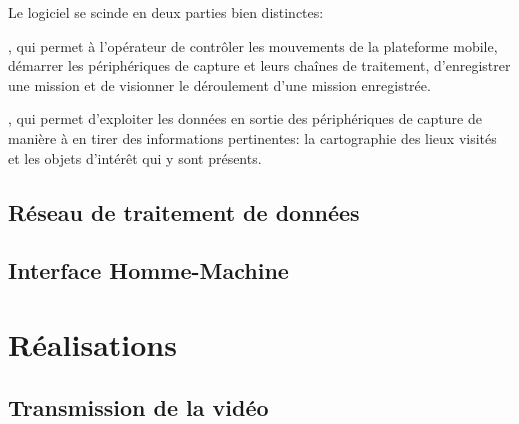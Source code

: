 			\par
			Le logiciel se scinde en deux parties bien distinctes:
			\begin{description}[noitemsep]
				\item[l'Interface Homme-Machine], qui permet à l'opérateur de contrôler les mouvements de la plateforme mobile, démarrer les périphériques de capture et leurs chaînes de traitement, d'enregistrer une mission et de visionner le déroulement d'une mission enregistrée.
				\item[le réseau de traitement de données], qui permet d'exploiter les données en sortie des périphériques de capture de manière à en tirer des informations pertinentes: la cartographie des lieux visités et les objets d'intérêt qui y sont présents.
			\end{description}

		\subsection{Réseau de traitement de données}

			
		\subsection{Interface Homme-Machine}
		\label{sub:ihm}


	\section{Réalisations}
	
		\subsection{Transmission de la vidéo}
		

